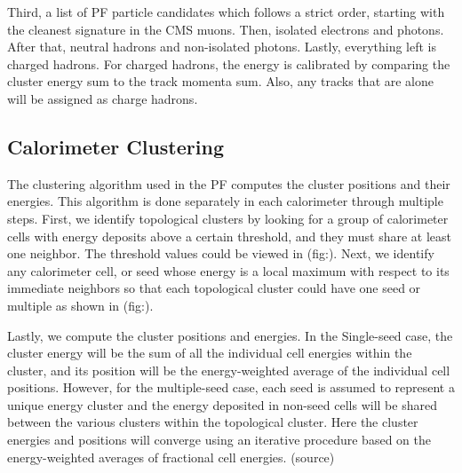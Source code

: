 Third, a list of PF particle candidates which follows a strict order, starting with the cleanest signature in the CMS muons. Then, isolated electrons and photons. After that, neutral hadrons and non-isolated photons. Lastly, everything left is charged hadrons. For charged hadrons, the energy is calibrated by comparing the cluster energy sum to the track momenta sum. Also, any tracks that are alone will be assigned as charge hadrons.


\subsection{Calorimeter Clustering}
The clustering algorithm used in the PF computes the cluster positions and their energies. This algorithm is done separately in each calorimeter through multiple steps. First, we identify topological clusters by looking for a group of calorimeter cells with energy deposits above a certain threshold, and they must share at least one neighbor. The threshold values could be viewed in (fig:). Next, we identify any calorimeter cell, or seed whose energy is a local maximum with respect to its immediate neighbors so that each topological cluster could have one seed or multiple as shown in (fig:).

Lastly, we compute the cluster positions and energies. In the Single-seed case, the cluster energy will be the sum of all the individual cell energies within the cluster, and its position will be the energy-weighted average of the individual cell positions. However, for the multiple-seed case, each seed is assumed to represent a unique energy cluster and the energy deposited in non-seed cells will be shared between the various clusters within the topological cluster. Here the cluster energies and positions will converge using an iterative procedure based on the energy-weighted averages of fractional cell energies. (source)



